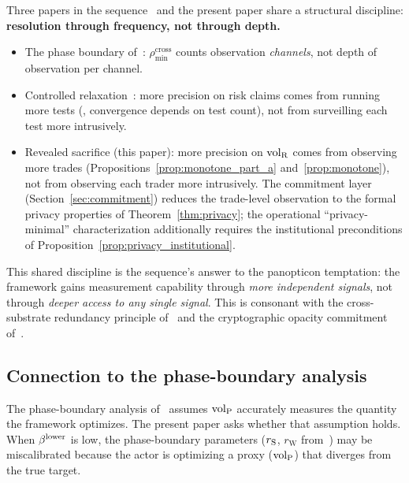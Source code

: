 Three papers in the
sequence~\citep{lasser2026phase,lasser2026wamura} and the present
paper share a structural discipline: \textbf{resolution through
frequency, not through depth.}

\begin{itemize}
\item The phase boundary
  of~\citep[Theorem~2]{lasser2026phase}:
  $\rho_{\min}^{\mathrm{cross}}$ counts observation
  \emph{channels}, not depth of observation per channel.
\item Controlled relaxation~\citep[Controlled~Relaxation]{lasser2026wamura}: more
  precision on risk claims comes from running more tests
  (\citealp[Theorem~2]{lasser2026wamura}, convergence depends on
  test count), not from surveilling each test more intrusively.
\item Revealed sacrifice (this paper): more precision on
  ${\operatorname{vol}_{\mathrm{R}}}$ comes from observing more trades
  (Propositions~\ref{prop:monotone_part_a}
  and~\ref{prop:monotone}), not from observing each trader more
  intrusively.  The commitment layer
  (Section~\ref{sec:commitment}) reduces the trade-level
  observation to the formal privacy properties of
  Theorem~\ref{thm:privacy}; the operational ``privacy-minimal''
  characterization additionally requires the institutional
  preconditions of
  Proposition~\ref{prop:privacy_institutional}.
\end{itemize}

This shared discipline is the sequence's answer to the
panopticon temptation: the framework gains measurement capability
through \emph{more independent signals}, not through
\emph{deeper access to any single signal}.  This is consonant
with the cross-substrate redundancy principle
of~\citep[Theorem~2]{lasser2026phase} and the cryptographic
opacity commitment of~\citep[Definition~6]{lasser2026exo}.

\subsection{Connection to the phase-boundary analysis}

The phase-boundary analysis of~\citep[Phase~Redundancy]{lasser2026phase} assumes
${\operatorname{vol}_{\mathrm{P}}}$ accurately measures the quantity the framework
optimizes.  The present paper asks whether that assumption
holds.  When $\beta^{\mathrm{lower}}$ is low, the phase-boundary parameters
($r_{\mathrm{S}}$, $r_{\mathrm{W}}$ from~\citep[Theorem~1]{lasser2026phase})
may be miscalibrated because the actor is optimizing a proxy
(${\operatorname{vol}_{\mathrm{P}}}$) that diverges from the true target.

